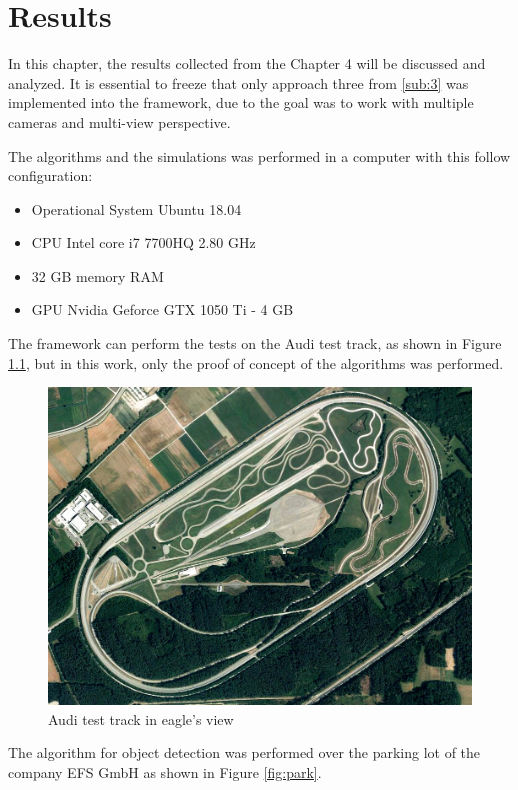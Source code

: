 \chapter{Results}
\label{capitulo5}

In this chapter, the results collected from the Chapter 4 will be discussed and analyzed. It is essential to freeze that only approach three from \ref{sub:3} was implemented into the framework, due to the goal was to work with multiple cameras and multi-view perspective.

The algorithms and the simulations was performed in a computer with this follow configuration:

\begin{itemize}
    \item Operational System Ubuntu 18.04
    \item CPU Intel core i7 7700HQ 2.80 GHz
    \item 32 GB memory RAM
    \item GPU Nvidia Geforce GTX 1050 Ti - 4 GB
\end{itemize}


The framework can perform the tests on the Audi test track, as shown in Figure \ref{fig:test_track}, but in this work, only the proof of concept of the algorithms was performed. 

\begin{figure}[H]
\centering
\includegraphics[scale=0.3]{imagens/testtrack.jpg}
\caption{Audi test track in eagle's view}
\label{fig:test_track}
\end{figure}


The algorithm for object detection was performed over the parking lot of the company EFS GmbH as shown in Figure \ref{fig:park}.


